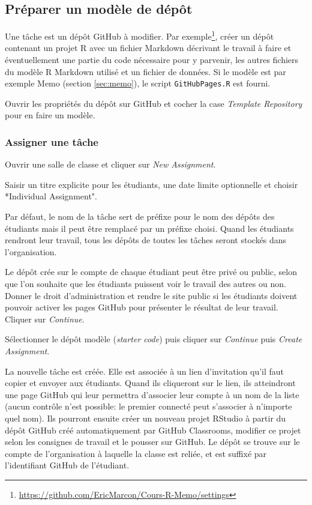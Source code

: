 \documentclass[
  11pt,
  french,
  a4paper,
  extrafontsizes,onecolumn,openright
  ]{memoir}
\begin{document}
\hypertarget{pruxe9parer-un-moduxe8le-de-duxe9puxf4t}{%
\subsection{Préparer un modèle de dépôt}\label{pruxe9parer-un-moduxe8le-de-duxe9puxf4t}}

Une tâche est un dépôt GitHub à modifier.
Par exemple\footnote{\url{https://github.com/EricMarcon/Cours-R-Memo/settings}}, créer un dépôt contenant un projet R avec un fichier Markdown décrivant le travail à faire et éventuellement une partie du code nécessaire pour y parvenir, les autres fichiers du modèle R Markdown utilisé et un fichier de données.
Si le modèle est par exemple Memo (section \ref{sec:memo}), le script \texttt{GitHubPages.R} est fourni.

Ouvrir les propriétés du dépôt sur GitHub et cocher la case \emph{Template Repository} pour en faire un modèle.

\hypertarget{assigner-une-tuxe2che}{%
\subsubsection{Assigner une tâche}\label{assigner-une-tuxe2che}}

Ouvrir une salle de classe et cliquer sur \emph{New Assignment}.

Saisir un titre explicite pour les étudiants, une date limite optionnelle et choisir *Individual Assignment".

Par défaut, le nom de la tâche sert de préfixe pour le nom des dépôts des étudiants mais il peut être remplacé par un préfixe choisi.
Quand les étudiants rendront leur travail, tous les dépôts de toutes les tâches seront stockés dans l'organisation.

Le dépôt crée sur le compte de chaque étudiant peut être privé ou public, selon que l'on souhaite que les étudiants puissent voir le travail des autres ou non.
Donner le droit d'administration et rendre le site public si les étudiants doivent pouvoir activer les pages GitHub pour présenter le résultat de leur travail.
Cliquer sur \emph{Continue}.

Sélectionner le dépôt modèle (\emph{starter code}) puis cliquer sur \emph{Continue} puis \emph{Create Assignment}.

La nouvelle tâche est créée.
Elle est associée à un lien d'invitation qu'il faut copier et envoyer aux étudiants.
Quand ils cliqueront sur le lien, ils atteindront une page GitHub qui leur permettra d'associer leur compte à un nom de la liste (aucun contrôle n'est possible: le premier connecté peut s'associer à n'importe quel nom).
Ils pourront ensuite créer un nouveau projet RStudio à partir du dépôt GitHub créé automatiquement par GitHub Classrooms, modifier ce projet selon les consignes de travail et le pousser sur GitHub.
Le dépôt se trouve sur le compte de l'organisation à laquelle la classe est reliée, et est suffixé par l'identifiant GitHub de l'étudiant.
\end{document}
